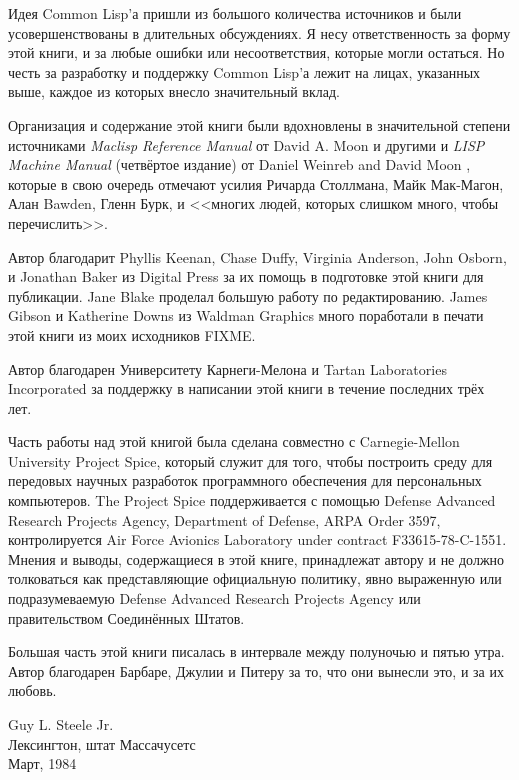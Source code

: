 Идея Common Lisp'а пришли из большого количества источников и были
усовершенствованы в длительных обсуждениях. 
Я несу ответственность за форму этой
книги, и за любые ошибки или несоответствия, которые могли остаться.
Но честь за разработку и поддержку Common Lisp'а лежит на
лицах, указанных выше, каждое из которых внесло значительный
вклад.

Организация и содержание
этой книги были вдохновлены в значительной степени источниками
\emph{Maclisp Reference Manual} от David A. Moon и другими \cite{MOONUAL}
и \emph{LISP Machine Manual} (четвёртое издание)
от Daniel Weinreb and David Moon \cite{BLUE-LISPM},
которые в свою очередь отмечают усилия Ричарда Столлмана, Майк Мак-Магон,
Алан Bawden, Гленн Бурк, и <<многих людей, которых слишком много, чтобы перечислить>>.

Автор благодарит Phyllis Keenan, Chase Duffy,
Virginia Anderson,
John Osborn,
и Jonathan Baker из Digital Press за их помощь в подготовке этой книги для
публикации.
Jane Blake проделал большую работу по редактированию.
James Gibson и Katherine Downs из Waldman Graphics много поработали в печати
этой книги из моих исходников FIXME.

Автор благодарен Университету Карнеги-Мелона и Tartan Laboratories Incorporated за
поддержку в написании этой книги в течение последних трёх лет.

Часть работы над этой книгой была
сделана совместно с Carnegie-Mellon University Project Spice,
который служит для того, чтобы построить среду для передовых научных разработок
программного обеспечения для персональных компьютеров.
The Project Spice
поддерживается с помощью Defense Advanced Research Projects Agency, Department   
of Defense, ARPA Order 3597, контролируется Air Force Avionics   
Laboratory under contract F33615-78-C-1551. Мнения
и выводы, содержащиеся в этой книге, принадлежат автору
и не должно толковаться как представляющие официальную политику,
явно выраженную или подразумеваемую Defense Advanced Research   
Projects Agency или правительством Соединённых Штатов.

Большая часть этой книги писалась в интервале между полуночью и пятью
утра. Автор благодарен Барбаре, Джулии и Питеру за то, что они вынесли это, и за
их любовь.

\begin{tabbing}
Guy L. Steele Jr. \\
Лексингтон, штат Массачусетс \\
Март, 1984
\end{tabbing}
\fi
